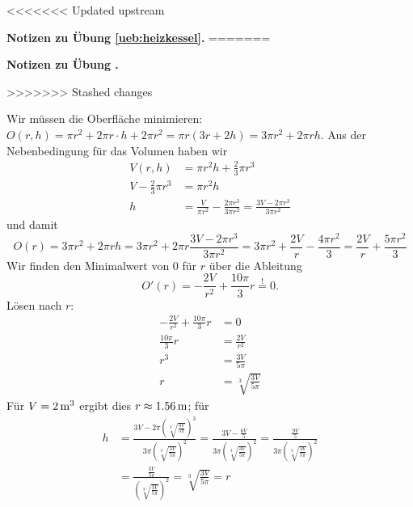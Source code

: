 \documentclass[%
<<<<<<< Updated upstream
11pt,%
twoside,%
titlepage,%
german,%
=======
11pt,%
twoside,%
titlepage,%
swissgerman,%
>>>>>>> Stashed changes
headsepline%
]{scrartcl}
\newcommand{\faReturnGray}{\textcolor{gray}{\faMailReply}} %
\theoremstyle{definition}
\theoremstyle{plain}
\newcommand{\concatueb}[1]{ueb:#1}%
\newcommand{\concatlsg}[1]{lsg:#1}%
\newcounter{uebcounter}[section]
\renewcommand{\theuebcounter}{\thesection.\arabic{uebcounter}}  %
\newenvironment{lsg}[1]{%
<<<<<<< Updated upstream
    \par\noindent\textbf{Notizen zu Übung \ref{\concatueb{#1}}.}%
    \label{\concatlsg{#1}}
=======
    \par\noindent\textbf{Notizen zu Übung \theuebcounter\label{\concatlsg{#1}}}
    \hfill\hyperref[\concatueb{#1}]{\faReturnGray}\par %
>>>>>>> Stashed changes
}{%
    \par%
}
\begin{document}
\begin{lsg}{heizkessel}
     Wir müssen die Oberfläche minimieren: $O(r,h)=\pi r^2+2\pi r\cdot h+2\pi r^2=\pi r(3r+2h)=3\pi r^2+2\pi rh$. Aus der Nebenbedingung für das Volumen haben wir
     \begin{align*}
         V(r,h) &= \pi r^2h+\frac{2}{3}\pi r^3\\
         V-\frac{2}{3}\pi r^3 &= \pi r^2h\\
         h &= \frac{V}{\pi r^2}-\frac{2\pi r^3}{3\pi r^2}=\frac{3V-2\pi r^3}{3\pi r^2}
     \end{align*}
     und damit
     $$O(r) = 3\pi r^2+2\pi rh = 3\pi r^2+2\pi r\frac{3V-2\pi r^3}{3\pi r^2}=3\pi r^2+\frac{2V}{r}-\frac{4\pi r^2}{3}=\frac{2V}{r}+\frac{5\pi r^2}{3}$$
     Wir finden den Minimalwert von $0$ für $r$ über die Ableitung
     $$O'(r)=-\frac{2V}{r^2}+\frac{10\pi}{3}r\stackrel{!}{=}0.$$
     Lösen nach $r$:
     \begin{align*}
         -\frac{2V}{r^2}+\frac{10\pi}{3}r &= 0\\
         \frac{10\pi}{3}r &= \frac{2V}{r^2}\\
         r^3 &= \frac{3V}{5\pi}\\
         r &= \sqrt[3]{\frac{3V}{5\pi}}
     \end{align*}
     Für $V=\unit[2]{m^3}$ ergibt dies $r\approx\unit[1.56]{m}$; für
     \begin{align*}
         h &= \frac{3V-2\pi \left(\sqrt[3]{\frac{3V}{5\pi}}\right)^3}{3\pi \left(\sqrt[3]{\frac{3V}{5\pi}}\right)^2}=\frac{3V- \frac{6V}{5}}{3\pi \left(\sqrt[3]{\frac{3V}{5\pi}}\right)^2}
         = \frac{\frac{9V}{5}}{3\pi \left(\sqrt[3]{\frac{3V}{5\pi}}\right)^2}\\
         &= \frac{\frac{3V}{5\pi}}{\left(\sqrt[3]{\frac{3V}{5\pi}}\right)^2}=\sqrt[3]{\frac{3V}{5\pi}}=r
     \end{align*}
\end{lsg}
\end{document}
